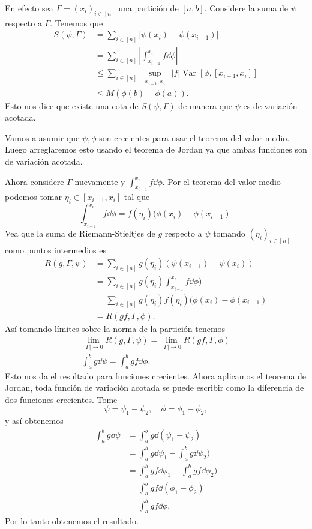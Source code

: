 \documentclass[12pt]{article}
\theoremstyle{plain}
\theoremstyle{definition}
\theoremstyle{remark}
\numberwithin{equation}{section}
\DeclareMathOperator{\Var}{Var}     %
\renewcommand{\leq}{\leqslant}      %
\renewcommand{\:}{\colon}           %
\newcommand{\bonj}[1]{\left\lbrack#1\right\rbrack}
\begin{document}
\begin{multicols}{2}
\begin{ptcbp}
En efecto sea $\Gamma=(x_i)_{i\in\bonj{n}}$ una partición de $\bonj{a,b}$. Considere la suma de $\psi$ respecto a $\Gamma$. Tenemos que
\begin{align*}
  S(\psi,\Gamma) &=\sum_{i\in\bonj{n}}|\psi(x_i)-\psi(x_{i-1})|\\
  &=\sum_{i\in\bonj{n}}\left|\int_{x_{i-1}}^{x_i}f\dd\phi\right|\\
  &\leq \sum_{i\in\bonj{n}}\sup_{\bonj{x_{i-1},x_i}}|f|\Var\bonj{\phi,\bonj{x_{i-1},x_i}}\\
  &\leq M(\phi(b)-\phi(a)).
\end{align*}
Esto nos dice que existe una cota de $S(\psi,\Gamma)$ de manera que $\psi$ es de variación acotada.\par
Vamos a asumir que $\psi,\phi$ son crecientes para usar el teorema del valor medio. Luego arreglaremos esto usando el teorema de Jordan ya que ambas funciones son de variación acotada.\par
Ahora considere $\Gamma$ nuevamente y $\int_{x_{i-1}}^{x_i}f\dd\phi$. Por el teorema del valor medio podemos tomar $\eta_i\in\bonj{x_{i-1},x_i}$ tal que
$$\int_{x_{i-1}}^{x_i}f\dd\phi=f(\eta_i)(\phi(x_i)-\phi(x_{i-1}).$$
Vea que la suma de Riemann-Stieltjes de $g$ respecto a $\psi$ tomando $(\eta_i)_{i\in\bonj{n}}$ como puntos intermedios es
\begin{align*}
  R(g,\Gamma,\psi) &=\sum_{i\in\bonj{n}}g(\eta_i)(\psi(x_{i-1})-\psi(x_i))\\
  &=\sum_{i\in\bonj{n}}g(\eta_i)\int_{x_{i-1}}^{x_i}f\dd\phi)\\
  &=\sum_{i\in\bonj{n}}g(\eta_i)f(\eta_i)(\phi(x_i)-\phi(x_{i-1})\\
  &=R(gf,\Gamma,\phi).
\end{align*}
Así tomando límites sobre la norma de la partición tenemos
\begin{gather*}
  \lim_{|\Gamma|\to 0}R(g,\Gamma,\psi)=\lim_{|\Gamma|\to 0}R(gf,\Gamma,\phi)\\
  \int_{a}^{b}g\dd\psi=\int_{a}^{b}gf\dd\phi.
\end{gather*}
Esto nos da el resultado para funciones crecientes. Ahora aplicamos el teorema de Jordan, toda función de variación acotada se puede escribir como la diferencia de dos funciones crecientes. Tome
$$\psi=\psi_1-\psi_2,\quad \phi=\phi_1-\phi_2,$$
y así obtenemos
\begin{align*}
  \int_{a}^{b}g\dd\psi &=\int_{a}^{b}g\dd(\psi_1-\psi_2)\\
  &=\int_{a}^{b}g\dd\psi_1-\int_{a}^{b}g\dd\psi_2)\\
  &=\int_{a}^{b}gf\dd\phi_1-\int_{a}^{b}gf\dd\phi_2)\\
  &=\int_{a}^{b}gf\dd(\phi_1-\phi_2)\\
  &=\int_{a}^{b}gf\dd\phi.
\end{align*}
Por lo tanto obtenemos el resultado.
\end{ptcbp}


\end{multicols}
\end{document}
